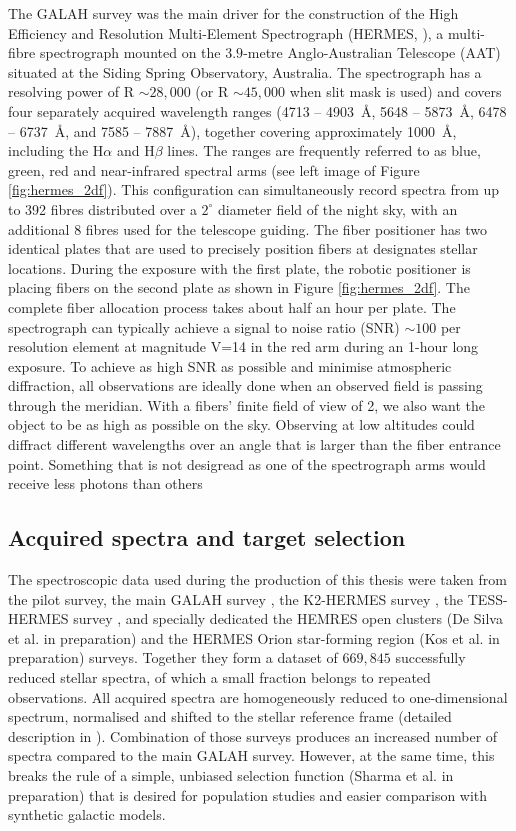 The GALAH survey was the main driver for the construction of the High Efficiency and Resolution Multi-Element Spectrograph (HERMES, \cite{2010SPIE.7735E..09B, 2015JATIS...1c5002S}), a multi-fibre spectrograph mounted on the $3.9$-metre Anglo-Australian Telescope (AAT) situated at the Siding Spring Observatory, Australia. The spectrograph has a resolving power of R $\sim 28,000$ (or R $\sim 45,000$ when slit mask is used) and covers four separately acquired wavelength ranges (4713 -- 4903~\AA, 5648 -- 5873~\AA, 6478 -- 6737~\AA, and 7585 -- 7887~\AA), together covering approximately 1000~\AA, including the H$\alpha$ and H$\beta$ lines. The ranges are frequently referred to as blue, green, red and near-infrared spectral arms (see left image of Figure \ref{fig:hermes_2df}). This configuration can simultaneously record spectra from up to 392 fibres distributed over a $2^\circ$ diameter field of the night sky, with an additional 8 fibres used for the telescope guiding. The fiber positioner has two identical plates that are used to precisely position fibers at designates stellar locations. During the exposure with the first plate, the robotic positioner is placing fibers on the second plate as shown in Figure \ref{fig:hermes_2df}. The complete fiber allocation process takes about half an hour per plate. The spectrograph can typically achieve a signal to noise ratio (SNR) $\sim100$ per resolution element at magnitude V=14 in the red arm during an 1-hour long exposure. To achieve as high SNR as possible and minimise atmospheric diffraction, all observations are ideally done when an observed field is passing through the meridian. With a fibers' finite field of view of 2\arcsec, we also want the object to be as high as possible on the sky. Observing at low altitudes could diffract different wavelengths over an angle that is larger than the fiber entrance point. Something that is not desigread as one of the spectrograph arms would receive less photons than others

\subsection{Acquired spectra and target selection}
The spectroscopic data used during the production of this thesis were taken from the pilot survey, the main GALAH survey \cite{2015MNRAS.449.2604D}, the K2-HERMES survey \cite{2018AJ....155...84W}, the TESS-HERMES survey \cite{2018MNRAS.473.2004S}, and specially dedicated the HEMRES open clusters (De Silva et al. in preparation) and the HERMES Orion star-forming region (Kos et al. in preparation) surveys. Together they form a dataset of $669,845$ successfully reduced stellar spectra, of which a small fraction belongs to repeated observations. All acquired spectra are homogeneously reduced to one-dimensional spectrum, normalised and shifted to the stellar reference frame (detailed description in \citet{2017MNRAS.464.1259K}). Combination of those surveys produces an increased number of spectra compared to the main GALAH survey. However, at the same time, this breaks the rule of a simple, unbiased selection function (Sharma et al. in preparation) that is desired for population studies and easier comparison with synthetic galactic models.

